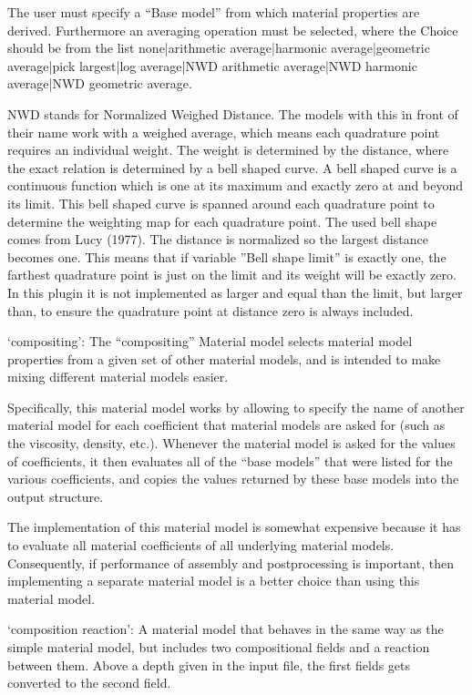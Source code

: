 \begin{itemize}
The user must specify a ``Base model'' from which material properties are derived. Furthermore an averaging operation must be selected, where the Choice should be from the list none|arithmetic average|harmonic average|geometric average|pick largest|log average|NWD arithmetic average|NWD harmonic average|NWD geometric average.

NWD stands for Normalized Weighed Distance. The models with this in front of their name work with a weighed average, which means each quadrature point requires an individual weight. The weight is determined by the distance, where the exact relation is determined by a bell shaped curve. A bell shaped curve is a continuous function which is one at its maximum and exactly zero at and beyond its limit. This bell shaped curve is spanned around each quadrature point to determine the weighting map for each quadrature point. The used bell shape comes from Lucy (1977). The distance is normalized so the largest distance becomes one. This means that if variable ''Bell shape limit'' is exactly one, the farthest quadrature point is just on the limit and its weight will be exactly zero. In this plugin it is not implemented as larger and equal than the limit, but larger than, to ensure the quadrature point at distance zero is always included.

`compositing': The ``compositing'' Material model selects material model properties from a given set of other material models, and is intended to make mixing different material models easier.

Specifically, this material model works by allowing to specify the name of another material model for each coefficient that material models are asked for (such as the viscosity, density, etc.). Whenever the material model is asked for the values of coefficients, it then evaluates all of the ``base models'' that were listed for the various coefficients, and copies the values returned by these base models into the output structure.

The implementation of this material model is somewhat expensive because it has to evaluate all material coefficients of all underlying material models. Consequently, if performance of assembly and postprocessing is important, then implementing a separate material model is a better choice than using this material model.

`composition reaction': A material model that behaves in the same way as the simple material model, but includes two compositional fields and a reaction between them. Above a depth given in the input file, the first fields gets converted to the second field. 


\end{itemize}
